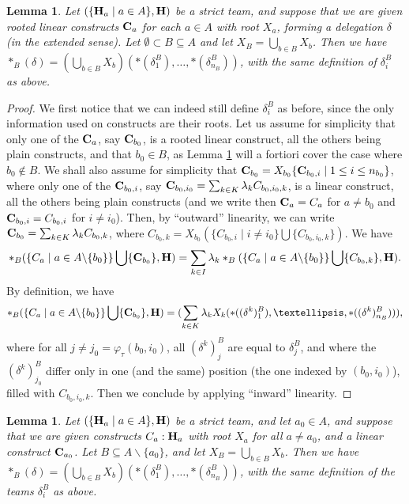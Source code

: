 \documentclass[11pt]{article}
\newtheorem{lemma}[theo]{Lemma}
\theoremstyle{definition}
\numberwithin{equation}{section}
\numberwithin{equation}{section}
\newcommand{\nin}{\not\in}
\newcommand{\inc}{\subseteq}
\newcommand{\set}[1]{\{#1\}}
\newcommand{\setc}[2]{\set{#1 \mid #2}}
\newcommand{\Union}{\bigcup}		%
\newcommand{\hyper}[1]{{\bf #1}}
\begin{document}
 
 \begin{lemma}\label{rooted-linear-construct-in-product}
Let $(\setc{\hyper{H}_a}{a\in A},\hyper{H})$ be a strict team, and suppose that we are given rooted linear constructs ${\bf C}_a$ for each $a\in A$ with root $X_a$, forming a delegation $\delta$ (in the extended sense). Let $\emptyset \subset B\inc A$ and  let $X_B=\Union_{b\in B}X_b$.  Then we have $\ast_B(\delta) =(\Union_{b\in B}X_b)(\ast(\delta^B_1),\dots,\ast(\delta^B_{n_{B}}))$, with the same 
definition of  $\delta^B_i$ as above. 
\end{lemma}
\begin{proof} We first notice that we can indeed still define $\delta_i^B$ as before, since the only information used on constructs are their roots.
Let us  assume for simplicity that only one of the ${\bf C}_a$, say ${\bf C}_{b_0}$,  is a  rooted linear construct, all the others being plain constructs,  and that $b_0\in B$,  as  Lemma \ref{linear-construct-in-product} will a fortiori cover the case where $b_0\nin B$. We shall also assume for simplicity that 
 ${\bf C}_{b_0}=X_{b_0}\setc{{\bf C}_{b_0,i}}{1\leq i \leq n_{b_0}}$, where only one of the ${\bf C}_{b_0,i}$, say 
${\bf C}_{b_0,i_0}= \sum_{k\in K}  \lambda_k C_{b_0,i_0,k} $, is a linear construct, all the others being plain constructs (and we write then
${\bf C}_a=C_a$ for $a\neq b_0$ and ${\bf C}_{b_0,i}= C_{b_0,i}$ for $i\neq i_0$). Then, by ``outward'' linearity, we can write 
${\bf C}_{b_0}=\sum_{k\in K} \lambda_k C_{b_0,k}$, where 
$C_{b_0,k}= X_{b_0}(\setc{{C}_{b_0,i}}{i\neq i_0} \Union \set{C_{b_0,i_0,k}})$. We have
$$\ast_B(\setc{C_a}{a \in A\backslash\set{b_0}}\Union 
\set{{\bf C}_{b_0}},\hyper{H})=\sum_{k\in I} \lambda_k \ast_B(\setc{C_a}{a \in A\backslash\set{b_0}}\Union 
\set{C_{b_0,k}},\hyper{H}).$$
By definition,
we have
$$\ast_B(\setc{C_a}{a \in A\backslash\set{b_0}}\Union 
\set{{\bf C}_{b_0}},\hyper{H})= (\sum_{k\in K}  \lambda_k X_k(\ast((\delta^k)^B_1),\dots,\ast((\delta^k)^B_{n_{B}}))),$$
where for all $j\neq j_0=\varphi_\tau(b_0,i_0)$, all $(\delta^k)^B_j$ are equal to $\delta^B_j$, and where the $(\delta^k)^B_{j_0}$ differ only in one (and the same) position (the one indexed by $(b_0,i_0)$), filled  with $C_{b_0,i_0,k}$. Then we conclude by  applying ``inward'' linearity.\end{proof}


\begin{lemma} \label{linear-construct-in-product}
Let $(\setc{\hyper{H}_a}{a\in A},\hyper{H})$ be a strict team, and let $a_0\in A$, and suppose that we are given constructs $C_a:\hyper{H}_a$ with root $X_a$ for all $a\neq a_0$, and a linear construct ${\bf C}_{a_0}$. Let $B\inc A\backslash\set{a_0}$, and let $X_B=\Union_{b\in B}X_b$.  
Then we have $\ast_B(\delta) =(\Union_{b\in B}X_b)(\ast(\delta^B_1),\dots,\ast(\delta^B_{n_{B}}))$, with the same 
definition of the teams $\delta^B_i$ as above. 
\end{lemma}
\end{document}
